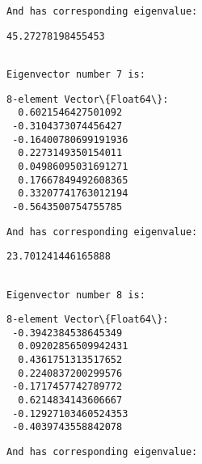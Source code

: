\documentclass[11pt]{article}
\begin{document}
    
    \begin{Verbatim}[commandchars=\\\{\}]
And has corresponding eigenvalue:
    \end{Verbatim}

    
    \begin{Verbatim}[commandchars=\\\{\}]
45.27278198455453
    \end{Verbatim}

    
    \begin{Verbatim}[commandchars=\\\{\}]

Eigenvector number 7 is:
    \end{Verbatim}

    
    \begin{Verbatim}[commandchars=\\\{\}]
8-element Vector\{Float64\}:
  0.6021546427501092
 -0.3104373074456427
 -0.16400780699191936
  0.2273149350154011
  0.04986095031691271
  0.17667849492608365
  0.33207741763012194
 -0.5643500754755785
    \end{Verbatim}

    
    \begin{Verbatim}[commandchars=\\\{\}]
And has corresponding eigenvalue:
    \end{Verbatim}

    
    \begin{Verbatim}[commandchars=\\\{\}]
23.701241446165888
    \end{Verbatim}

    
    \begin{Verbatim}[commandchars=\\\{\}]

Eigenvector number 8 is:
    \end{Verbatim}

    
    \begin{Verbatim}[commandchars=\\\{\}]
8-element Vector\{Float64\}:
 -0.3942384538645349
  0.09202856509942431
  0.4361751313517652
  0.2240837200299576
 -0.1717457742789772
  0.6214834143606667
 -0.12927103460524353
 -0.4039743558842078
    \end{Verbatim}

    
    \begin{Verbatim}[commandchars=\\\{\}]
And has corresponding eigenvalue:
    \end{Verbatim}
\end{document}
